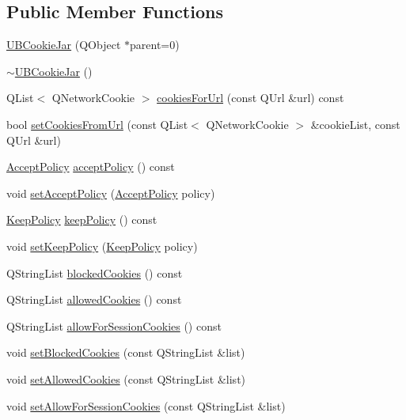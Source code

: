\subsection*{Public Member Functions}
\begin{DoxyCompactItemize}
\item 
\hyperlink{class_u_b_cookie_jar_a76f9672540e6ee867c6f8a8a31c0555b}{U\-B\-Cookie\-Jar} (Q\-Object $\ast$parent=0)
\item 
\hyperlink{class_u_b_cookie_jar_a4efd3ca12b7d075914317d9c230f8d8e}{$\sim$\-U\-B\-Cookie\-Jar} ()
\item 
Q\-List$<$ Q\-Network\-Cookie $>$ \hyperlink{class_u_b_cookie_jar_addc0d5f788aba3157ed9bd8d6bdbb3ec}{cookies\-For\-Url} (const Q\-Url \&url) const 
\item 
bool \hyperlink{class_u_b_cookie_jar_af6cb054cd0135c81d73967a5cdeb7bc5}{set\-Cookies\-From\-Url} (const Q\-List$<$ Q\-Network\-Cookie $>$ \&cookie\-List, const Q\-Url \&url)
\item 
\hyperlink{class_u_b_cookie_jar_a56b257f6334659d6cbee56ec159c6e30}{Accept\-Policy} \hyperlink{class_u_b_cookie_jar_aeabaec52c8ded8d0ad946077bf3158c9}{accept\-Policy} () const 
\item 
void \hyperlink{class_u_b_cookie_jar_ab6b6cf7752cbdd6287fd55f185933bf6}{set\-Accept\-Policy} (\hyperlink{class_u_b_cookie_jar_a56b257f6334659d6cbee56ec159c6e30}{Accept\-Policy} policy)
\item 
\hyperlink{class_u_b_cookie_jar_ad4d8ed16fd3d612f015191290e4b3cc5}{Keep\-Policy} \hyperlink{class_u_b_cookie_jar_ae06ecf6e5f07a99de69d186c63f0d8a1}{keep\-Policy} () const 
\item 
void \hyperlink{class_u_b_cookie_jar_a066435125753c0764d8370d6903d8ce6}{set\-Keep\-Policy} (\hyperlink{class_u_b_cookie_jar_ad4d8ed16fd3d612f015191290e4b3cc5}{Keep\-Policy} policy)
\item 
Q\-String\-List \hyperlink{class_u_b_cookie_jar_a94f3e9c29eaaf8060ab2f3ea174a0bbd}{blocked\-Cookies} () const 
\item 
Q\-String\-List \hyperlink{class_u_b_cookie_jar_a0f885182b7bd29860a39e89940d07b62}{allowed\-Cookies} () const 
\item 
Q\-String\-List \hyperlink{class_u_b_cookie_jar_a72932c89d37ed011dc0d92b43c787fdf}{allow\-For\-Session\-Cookies} () const 
\item 
void \hyperlink{class_u_b_cookie_jar_a3fb6b6d8bc9dfc02fd7405f228a01ac6}{set\-Blocked\-Cookies} (const Q\-String\-List \&list)
\item 
void \hyperlink{class_u_b_cookie_jar_a5b41e7e678fa8d7dc5594be00f14ed8f}{set\-Allowed\-Cookies} (const Q\-String\-List \&list)
\item 
void \hyperlink{class_u_b_cookie_jar_a2db5a5051d0c63a3e76a7073a23a9205}{set\-Allow\-For\-Session\-Cookies} (const Q\-String\-List \&list)
\end{DoxyCompactItemize}
